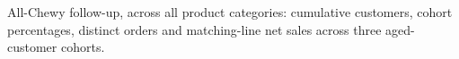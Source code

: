 All-Chewy follow-up, across all product categories: cumulative customers, cohort percentages, distinct orders and matching-line net sales across three aged-customer cohorts.
